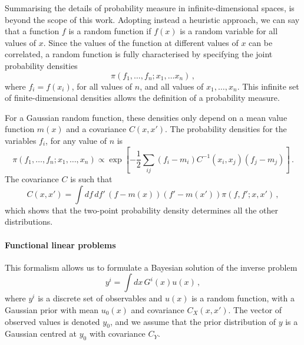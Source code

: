 Summarising the details of probability measure in infinite-dimensional spaces,
is beyond the scope of this work. Adopting instead a heuristic approach, we can
say that a function $f$ is a random function if $f(x)$ is a random variable for
all values of $x$. Since the values of the function at different values of $x$
can be correlated, a random function is fully characterised by specifying the
joint probability densities
\begin{equation}
  \label{eq:RandomFuncJointProb}
  \pi\left(
    f_1, \ldots, f_n; x_1, \ldots x_n
  \right)\, ,
\end{equation}
where $f_i=f(x_i)$, for all values of $n$, and all values of $x_1, \ldots, x_n$.
This infinite set of finite-dimensional densities allows the definition of a
probability measure. 

For a Gaussian random function, these densities only depend on a mean value
function $m(x)$ and a covariance $C(x,x')$. The probability densities for the
variables $f_i$, for any value of $n$ is 
\begin{equation}
  \label{eq:GaussianFunctC}
  \pi\left(f_1, \ldots, f_n; x_1, \ldots, x_n\right)
  \propto \exp \left[ 
      -\frac12 \sum_{ij} \left(f_i - m_i\right) C^{-1}(x_i,x_j) \left(f_j - m_j\right)
    \right]\, .
\end{equation} 
The covariance $C$ is such that
\begin{equation}
  \label{eq:CovFunctInt}
  C(x,x') = \int df\, df'\, \left(f - m(x)\right) \left(f'-m(x')\right)
    \pi\left(f,f';x,x'\right)\,,
\end{equation}
which shows that the two-point probability density determines all the other distributions. 

\paragraph{Functional linear problems} This formalism allows us to formulate a Bayesian 
solution of the inverse problem 
\begin{equation}
  \label{eq:BayesLinearInverse}
  y^i = \int dx\, G^i(x) u(x)\, ,
\end{equation}
where $y^i$ is a discrete set of observables and $u(x)$ is a random function,
with a Gaussian prior with mean $u_0(x)$ and covariance $C_{X}(x,x')$. 
The vector of observed values is denoted $y_0$, and we assume that the prior
distribution of $y$ is a Gaussian centred at $y_0$ with covariance $C_{Y}$.

